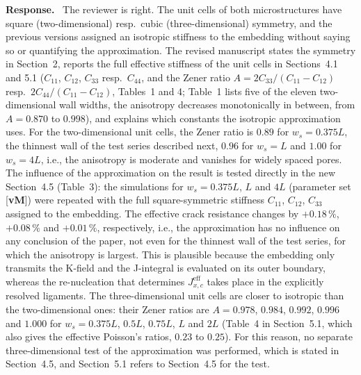 \documentclass[pdflatex,sn-mathphys-num]{sn-jnl}
\newcommand{\vMLabel}{[\textbf{vM}]\xspace}
\newenvironment{response}
  {\par\noindent\textbf{Response.}\ }
  {\par}
\begin{document}
\begin{response}
The reviewer is right. The unit cells of both microstructures have square (two-dimensional) resp.\ cubic (three-dimensional) symmetry, and the previous versions assigned an isotropic stiffness to the embedding without saying so or quantifying the approximation. The revised manuscript states the symmetry in Section~2, reports the full effective stiffness of the unit cells in Sections~4.1 and 5.1 ($C_{11}$, $C_{12}$, $C_{33}$ resp.\ $C_{44}$, and the Zener ratio $A = 2C_{33}/(C_{11}-C_{12})$ resp.\ $2C_{44}/(C_{11}-C_{12})$, Tables~1 and 4; Table~1 lists five of the eleven two-dimensional wall widths, the anisotropy decreases monotonically in between, from $A = 0.870$ to $0.998$), and explains which constants the isotropic approximation uses. For the two-dimensional unit cells, the Zener ratio is $0.89$ for $w_s = 0.375L$, the thinnest wall of the test series described next, $0.96$ for $w_s = L$ and $1.00$ for $w_s = 4L$, i.e., the anisotropy is moderate and vanishes for widely spaced pores. The influence of the approximation on the result is tested directly in the new Section~4.5 (Table~3): the simulations for $w_s = 0.375L$, $L$ and $4L$ (parameter set \vMLabel) were repeated with the full square-symmetric stiffness $C_{11}$, $C_{12}$, $C_{33}$ assigned to the embedding. The effective crack resistance changes by $+0.18\,\%$, $+0.08\,\%$ and $+0.01\,\%$, respectively, i.e., the approximation has no influence on any conclusion of the paper, not even for the thinnest wall of the test series, for which the anisotropy is largest. This is plausible because the embedding only transmits the K-field and the J-integral is evaluated on its outer boundary, whereas the re-nucleation that determines $J_{x,c}^{\text{eff}}$ takes place in the explicitly resolved ligaments. The three-dimensional unit cells are closer to isotropic than the two-dimensional ones: their Zener ratios are $A = 0.978$, $0.984$, $0.992$, $0.996$ and $1.000$ for $w_s = 0.375L$, $0.5L$, $0.75L$, $L$ and $2L$ (Table~4 in Section~5.1, which also gives the effective Poisson's ratios, $0.23$ to $0.25$). For this reason, no separate three-dimensional test of the approximation was performed, which is stated in Section~4.5, and Section~5.1 refers to Section~4.5 for the test.


\end{response}
\end{document}
